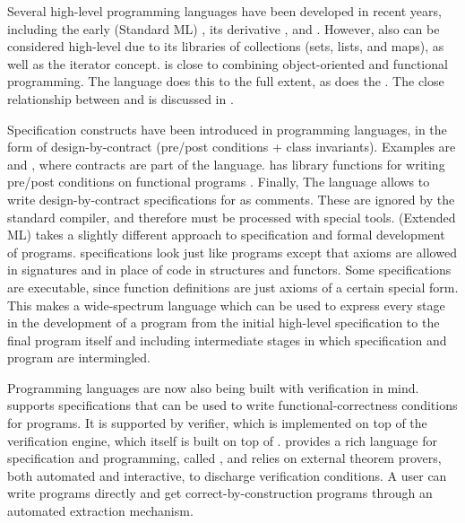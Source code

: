 Several high-level programming languages have been developed in recent
years, including the early \sml{} (Standard ML) \cite{standard-ml-97},
its derivative \ocaml{} \cite{ocaml}, and \haskell{}
\cite{haskell}. However, also \java{} can be considered high-level due
to its libraries of collections (sets, lists, and maps), as well as
the iterator concept. \python{} \cite{python} is close to combining
object-oriented and functional programming. The \scala{} \cite{scala}
language does this to the full extent, as does the \fortress{}
\cite{fortress}. The close relationship between \scala{} and \vdm{} is discussed in
\cite{havelund-scala-vdm-12}.

Specification constructs have been introduced in programming
languages, in the form of design-by-contract (pre/post conditions +
class invariants). Examples are \eiffel{} \cite{eiffel} and
\specsharp{} \cite{specsharp}, where contracts are part of the
language. \scala{} has library functions for writing pre/post
conditions on functional programs \cite{odersky-rv10}. Finally, The
\jml{} language \cite{jml} allows to write design-by-contract
specifications for \java{} as comments. These are ignored by the
standard \java{} compiler, and therefore must be processed with
special tools. \eml{} (Extended ML) \cite{sannella-eml-97} takes a
slightly different approach to specification and formal development of
\sml{} programs.  \eml{} specifications look just like \sml{} programs
except that axioms are allowed in signatures and in place of code in
structures and functors. Some \eml{} specifications are executable,
since \sml{} function definitions are just axioms of a certain special
form. This makes \eml{} a wide-spectrum language which can be used to
express every stage in the development of a \sml{} program from the
initial high-level specification to the final program itself and
including intermediate stages in which specification and program are
intermingled.

Programming languages are now also being built with verification in mind.
\dafny{} \cite{leino-lpar-2010} supports specifications that can be used to write functional-correctness conditions for programs.  It is supported by verifier, which is implemented on top of the \boogie{} verification engine, which itself is built on top of \zthree. 
\whythree{} \cite{filliatre-why3-2011} provides a rich language for specification and programming, called \whyml{}, and relies on external theorem provers, both automated and interactive, to discharge verification conditions. A user can write \whyml{} programs directly and get correct-by-construction \ocaml{} programs through an automated extraction mechanism. 

